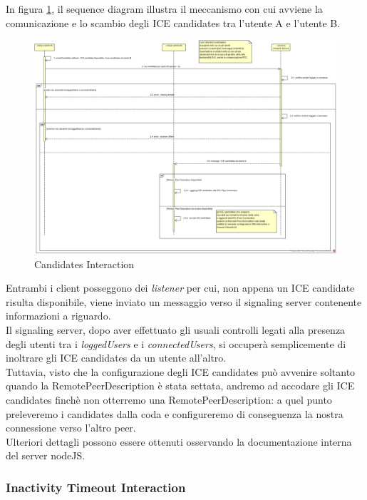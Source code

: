 In figura \ref{gfx:candidatesinteraction}, il sequence diagram illustra il meccanismo con cui avviene la comunicazione e lo scambio degli ICE candidates tra l'utente A e l'utente B.

\begin{figure}[!htbp]
	\centering
	\includegraphics[scale = .37]{img/sequence_candidates.png}
	\caption{Candidates Interaction}
	\label{gfx:candidatesinteraction}
\end{figure}

Entrambi i client posseggono dei \textit{listener} per cui, non appena un ICE candidate risulta disponibile, viene inviato un messaggio verso il signaling server contenente informazioni a riguardo.\\
Il signaling server, dopo aver effettuato gli usuali controlli legati alla presenza degli utenti tra i \textit{loggedUsers} e i \textit{connectedUsers}, si occuperà semplicemente di inoltrare gli ICE candidates da un utente all'altro.\\
Tuttavia, visto che la configurazione degli ICE candidates può avvenire soltanto quando la RemotePeerDescription è stata settata, andremo ad accodare gli ICE candidates finchè non otterremo una RemotePeerDescription: a quel punto preleveremo i candidates dalla coda e configureremo di conseguenza la nostra connessione verso l'altro peer.\\
Ulteriori dettagli possono essere ottenuti osservando la documentazione interna del server nodeJS.\\

\subsubsection{Inactivity Timeout Interaction}

